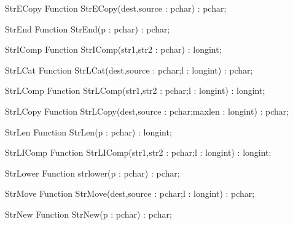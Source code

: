  
\begin{function}{StrECopy}
\Declaration
Function StrECopy(dest,source : pchar) : pchar;
\Description
\Errors
\SeeAlso
\end{function}

 
\begin{function}{StrEnd}
\Declaration
Function StrEnd(p : pchar) : pchar;
\Description
\Errors
\SeeAlso
\end{function}

 
\begin{function}{StrIComp}
\Declaration
Function StrIComp(str1,str2 : pchar) : longint;
\Description
\Errors
\SeeAlso
\end{function}

 
\begin{function}{StrLCat}
\Declaration
Function StrLCat(dest,source : pchar;l : longint) : pchar;
\Description
\Errors
\SeeAlso
\end{function}

 
\begin{function}{StrLComp}
\Declaration
Function StrLComp(str1,str2 : pchar;l : longint) : longint;
\Description
\Errors
\SeeAlso
\end{function}

 
\begin{function}{StrLCopy}
\Declaration
Function StrLCopy(dest,source : pchar;maxlen : longint) : pchar;
\Description
\Errors
\SeeAlso
\end{function}

 
\begin{function}{StrLen}
\Declaration
Function StrLen(p : pchar) : longint;
\Description
\Errors
\SeeAlso
\end{function}

 
\begin{function}{StrLIComp}
\Declaration
Function StrLIComp(str1,str2 : pchar;l : longint) : longint;
\Description
\Errors
\SeeAlso
\end{function}

 
\begin{function}{StrLower}
\Declaration
Function strlower(p : pchar) : pchar;
\Description
\Errors
\SeeAlso
\end{function}

 
\begin{function}{StrMove}
\Declaration
Function StrMove(dest,source : pchar;l : longint) : pchar;
\Description
\Errors
\SeeAlso
\end{function}

 
\begin{function}{StrNew}
\Declaration
Function StrNew(p : pchar) : pchar;
\Description
\Errors
\SeeAlso
\end{function}

